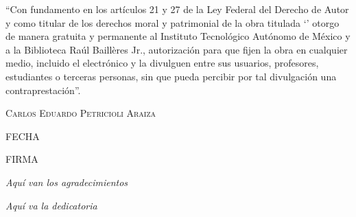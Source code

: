 \noindent ``Con fundamento en los artículos 21 y 27 de la Ley Federal del Derecho de Autor y como titular de los derechos moral y patrimonial de la obra titulada `{\scshape \thetitle}' otorgo de manera gratuita y permanente al Instituto Tecnológico Autónomo de México y a la Biblioteca Raúl Baillères Jr., autorización para que fijen la obra en cualquier medio, incluido el electrónico y la divulguen entre sus usuarios, profesores, estudiantes o terceras personas, sin que pueda percibir por tal divulgación una contraprestación''.

\begin{center}

\bigskip

\bigskip

\bigskip

\scshape Carlos Eduardo Petricioli Araiza

\vfill

\makebox[3.5 in]{\hrulefill}

\bigskip

FECHA

\bigskip

\bigskip

\bigskip

\makebox[3.5 in]{\hrulefill}

\bigskip

FIRMA
\end{center}

\newpage

\thispagestyle{plain}


\begin{flushright}
\textit{Aquí van los agradecimientos}

\end{flushright}

\newpage

\thispagestyle{plain}



\begin{flushright}
\textit{Aquí va la dedicatoria}

\end{flushright}


\tableofcontents
\thispagestyle{plain}

\listoffigures
\thispagestyle{plain}

\listoftables
\newpage

